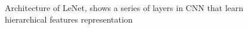 \begin{figure}
	\begin{center}
		\hsize {}
	\end{center}
	\caption{Architecture of LeNet, shows a series of layers in CNN that learn hierarchical features representation \cite{lecun1998gradient} }
	\label{fig:LeNet}
\end{figure}




